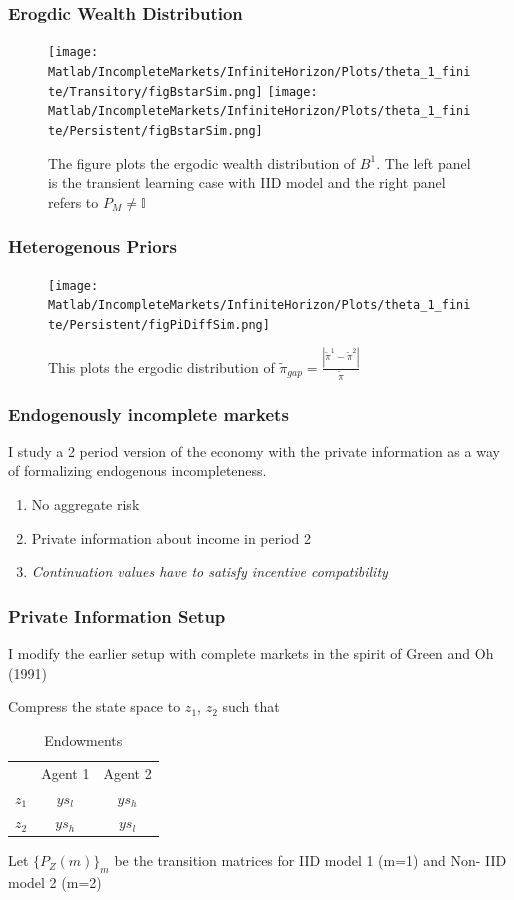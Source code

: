 \documentclass{beamer}
\theoremstyle{definition}
\begin{document}
\begin{frame}
\frametitle{Erogdic Wealth Distribution}
\begin{figure}[htbp]
\texttt{[image: Matlab/IncompleteMarkets/InfiniteHorizon/Plots/theta\_1\_finite/Transitory/figBstarSim.png]}
	  \hfill \texttt{[image: Matlab/IncompleteMarkets/InfiniteHorizon/Plots/theta\_1\_finite/Persistent/figBstarSim.png]}

\caption{\small {The figure plots the ergodic wealth distribution of $B^1$. The left panel is the transient learning case with IID model and the right panel refers to $P_M\neq\mathbb{I}$}}
\end{figure} 
\end{frame}

\begin{frame}
\frametitle{Heterogenous Priors}
\begin{figure}[htbp]
\centering
	  \texttt{[image: Matlab/IncompleteMarkets/InfiniteHorizon/Plots/theta\_1\_finite/Persistent/figPiDiffSim.png]}

	\caption{\small{This plots the ergodic distribution of $\tilde{\pi}_{gap}=\frac{|\tilde{\pi}^1-\tilde{\pi}^2|}{\tilde{\pi}}$ }}
 
	\label{fig:figPiDiff}
\end{figure} 
\end{frame}

\begin{frame}
\frametitle{Endogenously incomplete markets}
I study a 2 period version of the  economy with the private
information as a way of formalizing endogenous incompleteness.
\begin{enumerate}
\item No aggregate risk
\item Private information about income in period 2
\item \emph{Continuation values have to satisfy incentive compatibility}

\end{enumerate}
\end{frame}


\begin{frame}
\frametitle{Private Information Setup }
I modify the earlier setup with complete markets in the spirit of  Green and Oh (1991)

Compress the state space to $z_1$, $z_2$ such that

\begin{table}[h]
  \centering
  \begin{tabular}[h]{l c c}
    
& Agent 1 & Agent 2 \\
$z_1$ & $ys_l$ & $y s_h$  \\
$z_2$ & $ys_h$ & $ys_l$ \\
 
  \end{tabular}
  \caption{Endowments}
  
\end{table}

Let $\{P_Z(m)\}_m  $ be the transition matrices for IID model 1 (m=1) and
Non- IID model 2 (m=2)


\end{frame}
\end{document}
